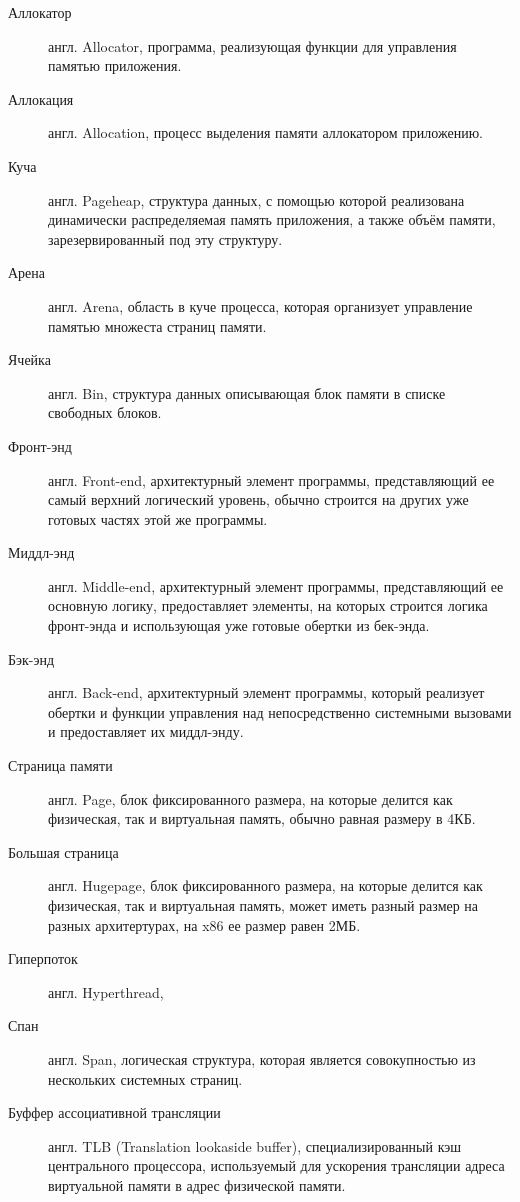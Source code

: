 \Defines %
\begin{description}
	\item[Аллокатор] англ. Allocator, программа, реализующая функции для управления памятью приложения.
	\item[Аллокация] англ. Allocation, процесс выделения памяти аллокатором приложению.
	\item[Куча] англ. Pageheap, структура данных, с помощью которой реализована динамически распределяемая память приложения, а также объём памяти, зарезервированный под эту структуру.
	\item[Арена] англ. Arena, область в куче процесса, которая организует управление памятью множеста страниц памяти.
	\item[Ячейка] англ. Bin, структура данных описывающая блок памяти в списке свободных блоков.
	\item[Фронт-энд] англ. Front-end, архитектурный элемент программы, представляющий ее самый верхний логический уровень, обычно строится на других уже готовых частях этой же программы.
	\item[Миддл-энд] англ. Middle-end, архитектурный элемент программы, представляющий ее основную логику, предоставляет элементы, на которых строится логика фронт-энда и использующая уже готовые обертки из бек-энда.
	\item[Бэк-энд] англ. Back-end, архитектурный элемент программы, который реализует обертки и функции управления над непосредственно системными вызовами и предоставляет их миддл-энду.
	\item[Страница памяти] англ. Page, блок фиксированного размера, на которые делится как физическая, так и виртуальная память, обычно равная размеру в 4КБ.
	\item[Большая страница] англ. Hugepage, блок фиксированного размера, на которые делится как физическая, так и виртуальная память, может иметь разный размер на разных архитертурах, на x86 ее размер равен 2МБ.
	\item[Гиперпоток] англ. Hyperthread, 
	\item[Спан] англ. Span, логическая структура, которая является совокупностью из нескольких системных страниц.
	\item[Буффер ассоциативной трансляции] англ. TLB (Translation lookaside buffer), специализированный кэш центрального процессора, используемый для ускорения трансляции адреса виртуальной памяти в адрес физической памяти.
\end{description}

